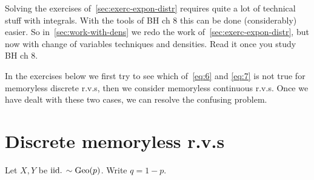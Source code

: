 \documentclass[a4paper,11pt]{article}
\begin{document}
Solving the exercises of~\cref{sec:exerc-expon-distr} requires quite a lot of technical stuff with integrals.
With the tools of BH ch 8 this can be done (considerably) easier.
So in~\cref{sec:work-with-dens} we redo the work of~\cref{sec:exerc-expon-distr}, but now with change of variables techniques and densities.
Read it once you study BH ch 8.




In the exercises below we first try to see which of~\cref{eq:6} and \cref{eq:7} is not true for memoryless discrete r.v.s, then we consider memoryless continuous r.v.s. Once we have dealt with these two cases, we can  resolve the confusing problem.


\section{Discrete memoryless r.v.s}
\label{sec:set-1}


Let $X,Y$ be $\mathrm{iid.}\, \sim \mathrm{Geo}(p)$. Write $q = 1-p$.
\end{document}
